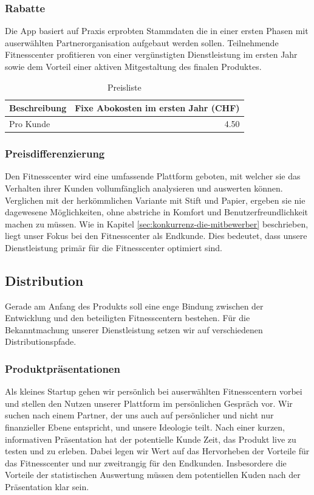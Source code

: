 \subsubsection{Rabatte}
Die App basiert auf Praxis erprobten Stammdaten die in einer ersten Phasen mit auserwählten Partnerorganisation aufgebaut werden sollen. Teilnehmende Fitnesscenter profitieren von einer vergünstigten Dienstleistung im ersten Jahr sowie dem Vorteil einer aktiven Mitgestaltung des finalen Produktes. 

\begin{table}[h]
	\centering
	\begin{tabu} to \linewidth {l r}
		\toprule 
		Beschreibung & Fixe Abokosten im ersten Jahr (CHF) \\
		\midrule
		Pro Kunde & 4.50 \\
		\bottomrule 
	\end{tabu} 
	\caption{Preisliste}
\end{table}

\subsubsection{Preisdifferenzierung}
Den Fitnesscenter wird eine umfassende Plattform geboten, mit welcher sie das Verhalten ihrer Kunden vollumfänglich analysieren und auswerten können. Verglichen mit der herkömmlichen Variante mit Stift und Papier, ergeben sie nie dagewesene Möglichkeiten, ohne abstriche in Komfort und Benutzerfreundlichkeit machen zu müssen. Wie in Kapitel \ref{sec:konkurrenz-die-mitbewerber} beschrieben, liegt unser Fokus bei den Fitnesscenter als Endkunde. Dies bedeutet, dass unsere Dienstleistung primär für die Fitnesscenter optimiert sind.

\subsection{Distribution}
Gerade am Anfang des Produkts soll eine enge Bindung zwischen der Entwicklung und den beteiligten Fitnesscentern bestehen. Für die Bekanntmachung unserer Dienstleistung setzen wir auf verschiedenen Distributionspfade. 

\subsubsection{Produktpräsentationen}
Als kleines Startup gehen wir persönlich bei auserwählten Fitnesscentern vorbei und stellen den Nutzen unserer Plattform im persönlichen Gespräch vor. Wir suchen nach einem Partner, der uns auch auf persönlicher und nicht nur finanzieller Ebene entspricht, und unsere Ideologie teilt. Nach einer kurzen, informativen Präsentation hat der potentielle Kunde Zeit, das Produkt live zu testen und zu erleben. Dabei legen wir Wert auf das Hervorheben der Vorteile für das Fitnesscenter und nur zweitrangig für den Endkunden. Insbesordere die Vorteile der statistischen Auswertung müssen dem potentiellen Kuden nach der Präsentation klar sein.

